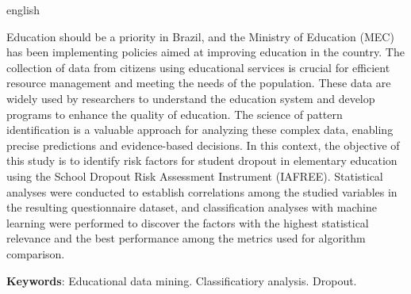 
\begin{resumo}[Abstract]
 \begin{otherlanguage*}{english}

Education should be a priority in Brazil, and the Ministry of Education (MEC) has been implementing policies aimed at improving education in the country. The collection of data from citizens using educational services is crucial for efficient resource management and meeting the needs of the population. These data are widely used by researchers to understand the education system and develop programs to enhance the quality of education. The science of pattern identification is a valuable approach for analyzing these complex data, enabling precise predictions and evidence-based decisions. In this context, the objective of this study is to identify risk factors for student dropout in elementary education using the School Dropout Risk Assessment Instrument (IAFREE). Statistical analyses were conducted to establish correlations among the studied variables in the resulting questionnaire dataset, and classification analyses with machine learning were performed to discover the factors with the highest statistical relevance and the best performance among the metrics used for algorithm comparison.


   \textbf{Keywords}: Educational data mining. Classificatiory analysis. Dropout.
 \end{otherlanguage*}
\end{resumo}
